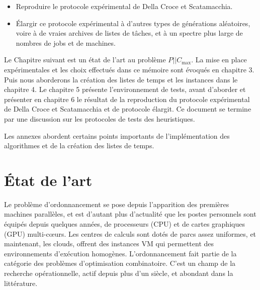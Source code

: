 \documentclass[a4paper,12pt]{report}
\theoremstyle{plain}				%
\theoremstyle{definition}				%
\newcommand\problemGrahamP{$P||C_{\max}$\xspace}
\newcommand\dcs{Della Croce et Scatamacchia\xspace}
\newcommand{\fco}[1]{\todo[author=FCO,color=teal,inline]{#1}}
\begin{document}
\begin{itemize}
	\item Reproduire le protocole expérimental de \dcs.  
	\item \'{E}largir ce protocole expérimental à d'autres types de générations aléatoires, 
	voire à de vraies archives de listes de tâches, et à un spectre plus large de nombres de jobs et de machines.  
\end{itemize} 

\bigskip
\fco{a revoir}
Le Chapitre suivant est un état de l'art au problème \problemGrahamP. La mise en place expérimentales et les choix effectués dans ce mémoire sont évoqués en chapitre 3. Puis nous aborderons la création des listes de temps et les instances dans le chapitre 4. Le chapitre 5 présente l'environnement de tests, avant d'aborder et présenter en chapitre 6 le résultat de la reproduction du protocole expérimental de \dcs et de protocole élargit. Ce document se termine par une discussion sur les protocoles de tests des heuristiques.    

Les annexes abordent certains points importants de l'implémentation des algorithmes et de la création des listes de temps.  

\section{\'{E}tat de l'art} \label{sec:etatDeLArt}

Le problème d'ordonnancement se pose depuis l'apparition des premières machines parallèles, et 
  est d'autant plus d'actualité que les postes personnels sont équipés depuis quelques années, 
  de processeurs (CPU) et de cartes graphiques (GPU) multi-c{\oe}urs.
Les centres de calculs sont dotés de parcs assez uniformes, et maintenant, 
  les clouds, offrent des instances VM qui permettent des environnements 
  d'exécution homogènes.     
L'ordonnancement fait partie de la catégorie des problèmes d'optimisation combinatoire. 
C'est un champ de la recherche opérationnelle, actif depuis plus d'un siècle, 
  et abondant dans la littérature. 
\end{document}
